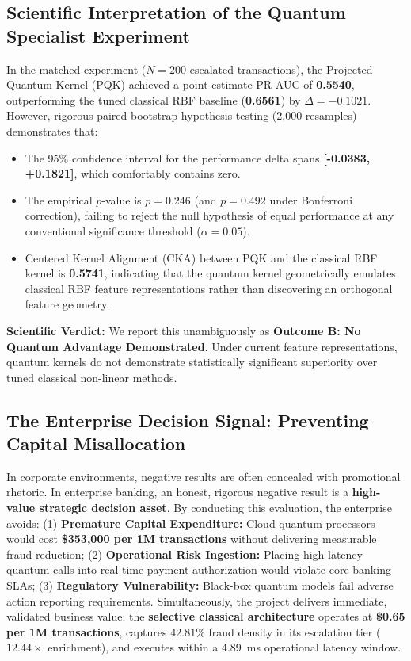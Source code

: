 \documentclass[10pt,a4paper]{article}
\begin{document}
\vspace{-5pt}

\subsection{Scientific Interpretation of the Quantum Specialist Experiment}
In the matched experiment ($N=200$ escalated transactions), the Projected Quantum Kernel (PQK) achieved a point-estimate PR-AUC of \textbf{0.5540}, outperforming the tuned classical RBF baseline (\textbf{0.6561}) by $\Delta = -0.1021$. However, rigorous paired bootstrap hypothesis testing (2,000 resamples) demonstrates that:
\begin{itemize}[leftmargin=*,itemsep=0.4pt,topsep=1pt]
\item The 95\% confidence interval for the performance delta spans \textbf{[-0.0383, +0.1821]}, which comfortably contains zero.
\item The empirical $p$-value is \textbf{$p = 0.246$} (and $p = 0.492$ under Bonferroni correction), failing to reject the null hypothesis of equal performance at any conventional significance threshold ($\alpha = 0.05$).
\item Centered Kernel Alignment (CKA) between PQK and the classical RBF kernel is \textbf{0.5741}, indicating that the quantum kernel geometrically emulates classical RBF feature representations rather than discovering an orthogonal feature geometry.
\end{itemize}
\textbf{Scientific Verdict:} We report this unambiguously as \textbf{Outcome B: No Quantum Advantage Demonstrated}. Under current feature representations, quantum kernels do not demonstrate statistically significant superiority over tuned classical non-linear methods.

\subsection{The Enterprise Decision Signal: Preventing Capital Misallocation}
In corporate environments, negative results are often concealed with promotional rhetoric. In enterprise banking, an honest, rigorous negative result is a \textbf{high-value strategic decision asset}. 
By conducting this evaluation, the enterprise avoids: (1) \textbf{Premature Capital Expenditure:} Cloud quantum processors would cost \textbf{\$353,000 per 1M transactions} without delivering measurable fraud reduction; (2) \textbf{Operational Risk Ingestion:} Placing high-latency quantum calls into real-time payment authorization would violate core banking SLAs; (3) \textbf{Regulatory Vulnerability:} Black-box quantum models fail adverse action reporting requirements.
Simultaneously, the project delivers immediate, validated business value: the \textbf{selective classical architecture} operates at \textbf{\$0.65 per 1M transactions}, captures $42.81\%$ fraud density in its escalation tier ($12.44\times$ enrichment), and executes within a 4.89~ms operational latency window.
\end{document}
